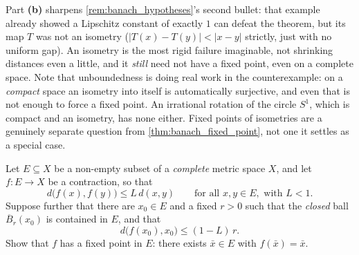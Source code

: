 \begin{remark}
Part \textbf{(b)} sharpens \cref{rem:banach_hypotheses}'s second bullet: that example already
showed a Lipschitz constant of exactly $1$ can defeat the theorem, but its map $T$ was not an
isometry ($|T(x)-T(y)| < |x-y|$ strictly, just with no uniform gap). An isometry is the most
rigid failure imaginable, not shrinking distances even a little, and it \emph{still} need not have
a fixed point, even on a complete space. Note that unboundedness is doing real work in the
counterexample: on a \emph{compact} space an isometry into itself is automatically surjective, and
even that is not enough to force a fixed point. An irrational rotation of the circle $S^1$, which
is compact and an isometry, has none either. Fixed points of isometries are a
genuinely separate question from \cref{thm:banach_fixed_point}, not one it settles as a special
case.
\end{remark}

\begin{exercise}
\label{ex:kobel_local_banach_fixed_point}
Let $E \subseteq X$ be a non-empty subset of a \emph{complete} metric space $X$, and let
$f : E \to X$ be a contraction, so that
\[d\big(f(x),f(y)\big) \le L\,d(x,y) \qquad \text{for all } x,y \in E, \text{ with } L < 1.\]
Suppose further that there are $x_0 \in E$ and a fixed $r > 0$ such that the \emph{closed} ball
$\overline{B}_r(x_0)$ is contained in $E$, and that
\[d\big(f(x_0),x_0\big) \le (1-L)\,r.\]
Show that $f$ has a fixed point in $E$: there exists $\bar x \in E$ with $f(\bar x) = \bar x$.
\end{exercise}

